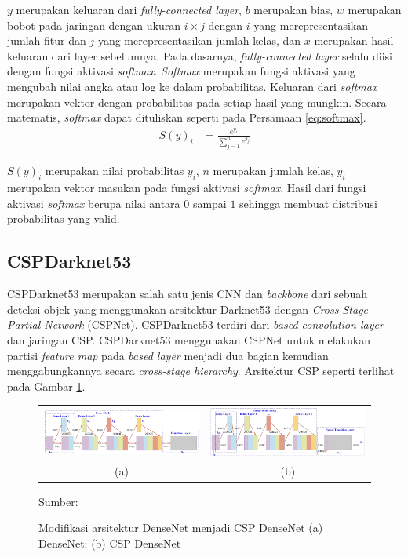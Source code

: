    $y$ merupakan keluaran dari \textit{fully-connected layer}, $b$ merupakan bias, $w$ merupakan bobot pada jaringan dengan ukuran $i\times j$ dengan $i$ yang merepresentasikan jumlah fitur dan $j$ yang merepresentasikan jumlah kelas, dan $x$ merupakan hasil keluaran dari layer sebelumnya.
	Pada dasarnya, \textit{fully-connected layer} selalu diisi dengan fungsi aktivasi \textit{softmax}. \textit{Softmax} merupakan fungsi aktivasi yang mengubah nilai angka atau log ke dalam probabilitas. Keluaran dari \textit{softmax} merupakan vektor dengan probabilitas pada setiap hasil yang mungkin. Secara matematis, \textit{softmax} dapat dituliskan seperti pada Persamaan \ref{eq:softmax}.
    \begin{align}
        S(y)_i &= \frac{e^{y_i}}{\sum_{j=1}^{n} e^{y_j}} 
        \label{eq:softmax}
    \end{align}

    $S(y)_i$ merupakan nilai probabilitas $y_i$, $n$ merupakan jumlah kelas, $y_i$ merupakan vektor masukan pada fungsi aktivasi \textit{softmax}. Hasil dari fungsi aktivasi \textit{softmax} berupa nilai antara $0$ sampai $1$ sehingga membuat distribusi probabilitas yang valid.

    \subsection{CSPDarknet53}
    CSPDarknet53 merupakan salah satu jenis CNN dan \textit{backbone} dari sebuah deteksi objek yang menggunakan arsitektur Darknet53 dengan \textit{Cross Stage Partial Network} (CSPNet). CSPDarknet53 terdiri dari \textit{based convolution layer} dan jaringan CSP. CSPDarknet53 menggunakan CSPNet untuk melakukan partisi \textit{feature map} pada \textit{based layer} menjadi dua bagian kemudian menggabungkannya secara \textit{cross-stage hierarchy}. Arsitektur CSP seperti terlihat pada Gambar \ref{fig:cspnet}.

    \begin{figure}[H]
        \centering
        \begin{tabular}{cc}
            \includegraphics[width=7cm]{../img/DenseNet - Latex.PNG}
            &
            \includegraphics[width=7cm]{../img/CSP DenseNet - Latex.PNG}\\
            (a) &(b)\\
        \end{tabular}
        \caption{Modifikasi arsitektur DenseNet menjadi CSP DenseNet (a) DenseNet; (b) CSP DenseNet}
        \label{fig:cspnet}
        Sumber: \citep{Wang2020}
    \end{figure}

